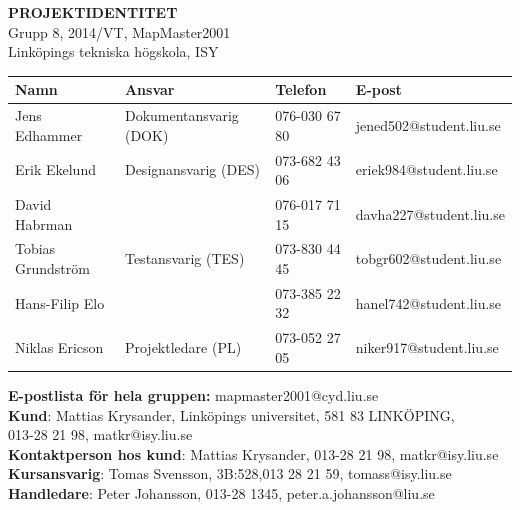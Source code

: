 \documentclass[a4paper,12pt,fleqn]{article}
\begin{document}
	\vspace*{\fill}
		\begingroup
			\begin{center}
				\LARGE{\textbf{PROJEKTIDENTITET}}
				\\
				\footnotesize
				Grupp 8, 2014/VT, MapMaster2001
				\\
				Linköpings tekniska högskola, ISY
				\\
				\vspace{1cm}
	  \begin{tabular}{| p{3cm} | p{4.3cm} | p{2.4cm} | p{3.8cm} |}
	    \hline
		\textbf{Namn} & \textbf{Ansvar} & \textbf{Telefon} & \textbf{E-post} \\ \hline
	    Jens Edhammer & Dokumentansvarig (DOK) & 076-030 67 80 & jened502@student.liu.se \\ \hline
		Erik Ekelund & Designansvarig (DES) & 073-682 43 06 & eriek984@student.liu.se \\ \hline
		David Habrman &  & 076-017 71 15 & davha227@student.liu.se \\ \hline 
		Tobias Grundström & Testansvarig (TES) & 073-830 44 45 & tobgr602@student.liu.se \\ \hline 
		Hans-Filip Elo &   & 073-385 22 32 & hanel742@student.liu.se \\ \hline 
		Niklas Ericson & Projektledare (PL) & 073-052 27 05 & niker917@student.liu.se \\ \hline
	    \end{tabular}
		
		\vspace{1cm}
		\textbf{E-postlista för hela gruppen:} mapmaster2001@cyd.liu.se
		\\[0.5cm]
		
		\textbf{Kund}: Mattias Krysander, Linköpings universitet, 581 83  LINKÖPING, \\
		013-28 21 98, matkr@isy.liu.se \\
		\textbf{Kontaktperson hos kund}: Mattias Krysander, 013-28 21 98, matkr@isy.liu.se 
		\\
		\textbf{Kursansvarig}: Tomas Svensson, 3B:528,013 28 21 59, tomass@isy.liu.se
		\\[0.5cm]
		\textbf{Handledare}: Peter Johansson, 013-28 1345, peter.a.johansson@liu.se

				\end{center}
		\endgroup
	\vspace*{\fill}
\newpage

\end{document}
